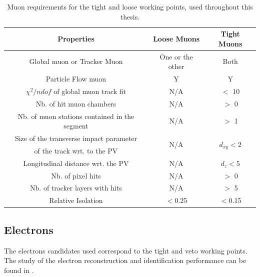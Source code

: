 \begin{table}[htbp]
	\centering
	\caption{Muon requirements for the tight and loose working points, used throughout this thesis.}
	\begin{tabular}{ccc}
		\toprule
		Properties & Loose Muons & Tight Muons \\ 
		\midrule 
		Global muon or Tracker Muon & One or the other & Both \\ 
	
		Particle Flow muon & Y & Y \\ 
		
		$\chi^2/ndof$ of global muon track fit & N/A & $<$ 10 \\ 
	
		Nb. of hit muon chambers & N/A & $>$ 0 \\ 
		
		Nb. of muon stations contained in the segment & N/A & $>$ 1  \\ 
		
		 Size of the transverse impact parameter  & \multirow{2}{*}{N/A }& \multirow{2}{*}{$d_{xy} < 2$ \mm} \\ 
	 of the track wrt. to the PV & & \\
		Longitudinal distance wrt. the PV & N/A & $d_z < 5$ \mm \\ 
		
		Nb. of pixel hits & N/A & $>$ 0 \\ 
		
		Nb. of tracker layers with hits & N/A & $>$ 5 \\ 
	
		Relative Isolation & $<$0.25 & $<$0.15 \\
		\bottomrule
	\end{tabular} 
	
	\label{tab:MuonReq}
\end{table}


\newpage
\subsection{Electrons}
\label{sec:ElectronID}
The electrons candidates used correspond to the tight and veto working points. The study of the electron reconstruction and identification performance can be found in \cite{CMS-DP-2017-004}.

